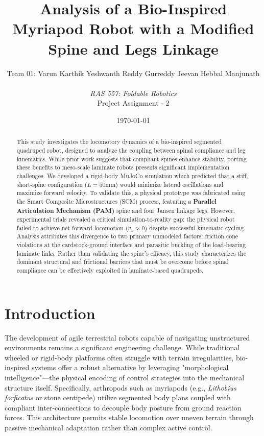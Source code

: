 \documentclass[11pt, a4paper]{article}
\title{\textbf{Analysis of a Bio-Inspired Myriapod Robot with a Modified Spine and Legs Linkage}}
\author{Team 01: Varun Karthik \quad Yeshwanth Reddy Gurreddy \quad Jeevan Hebbal Manjunath\\\\\textit{RAS 557: Foldable Robotics}\\ Project Assignment - 2}
\date{\today}
\begin{document}
\maketitle

\begin{abstract}
This study investigates the locomotory dynamics of a bio-inspired segmented quadruped robot, designed to analyze the coupling between spinal compliance and leg kinematics. While prior work suggests that compliant spines enhance stability, porting these benefits to meso-scale laminate robots presents significant implementation challenges. We developed a rigid-body MuJoCo simulation which predicted that a stiff, short-spine configuration ($L=50$mm) would minimize lateral oscillations and maximize forward velocity. To validate this, a physical prototype was fabricated using the Smart Composite Microstructures (SCM) process, featuring a \textbf{Parallel Articulation Mechanism (PAM)} spine and four Jansen linkage legs. However, experimental trials revealed a critical simulation-to-reality gap: the physical robot failed to achieve net forward locomotion ($v_x \approx 0$) despite successful kinematic cycling. Analysis attributes this divergence to two primary unmodeled factors: friction cone violations at the cardstock-ground interface and parasitic buckling of the load-bearing laminate links. Rather than validating the spine's efficacy, this study characterizes the dominant structural and frictional barriers that must be overcome before spinal compliance can be effectively exploited in laminate-based quadrupeds.
\end{abstract}
\clearpage
{
    \hypersetup{linkcolor=black}
    \small
    \tableofcontents
}
\thispagestyle{plain}
\clearpage

\section{Introduction}
\label{sec:introduction}

The development of agile terrestrial robots capable of navigating unstructured environments remains a significant engineering challenge. While traditional wheeled or rigid-body platforms often struggle with terrain irregularities, bio-inspired systems offer a robust alternative by leveraging "morphological intelligence"—the physical encoding of control strategies into the mechanical structure itself. Specifically, arthropods such as myriapods (e.g., \textit{Lithobius forficatus} or stone centipede) utilize segmented body plans coupled with compliant inter-connections to decouple body posture from ground reaction forces. This architecture permits stable locomotion over uneven terrain through passive mechanical adaptation rather than complex active control. 
\end{document}

